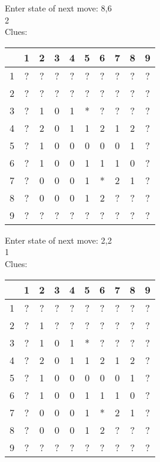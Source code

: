 Enter state of next move: 8,6\\
2\\
Clues:\\
\begin{tabular}{|c|c|c|c|c|c|c|c|c|c|}
\hline
  & 1 & 2 & 3 & 4 & 5 & 6 & 7 & 8 & 9\\
\hline
1 & ? & ? & ? & ? & ? & ? & ? & ? & ?\\
\hline
2 & ? & ? & ? & ? & ? & ? & ? & ? & ?\\
\hline
3 & ? & 1 & 0 & 1 & * & ? & ? & ? & ?\\
\hline
4 & ? & 2 & 0 & 1 & 1 & 2 & 1 & 2 & ?\\
\hline
5 & ? & 1 & 0 & 0 & 0 & 0 & 0 & 1 & ?\\
\hline
6 & ? & 1 & 0 & 0 & 1 & 1 & 1 & 0 & ?\\
\hline
7 & ? & 0 & 0 & 0 & 1 & * & 2 & 1 & ?\\
\hline
8 & ? & 0 & 0 & 0 & 1 & 2 & ? & ? & ?\\
\hline
9 & ? & ? & ? & ? & ? & ? & ? & ? & ?\\
\hline
\end{tabular}

Enter state of next move: 2,2\\
1\\
Clues:\\
\begin{tabular}{|c|c|c|c|c|c|c|c|c|c|}
\hline
  & 1 & 2 & 3 & 4 & 5 & 6 & 7 & 8 & 9\\
\hline
1 & ? & ? & ? & ? & ? & ? & ? & ? & ?\\
\hline
2 & ? & 1 & ? & ? & ? & ? & ? & ? & ?\\
\hline
3 & ? & 1 & 0 & 1 & * & ? & ? & ? & ?\\
\hline
4 & ? & 2 & 0 & 1 & 1 & 2 & 1 & 2 & ?\\
\hline
5 & ? & 1 & 0 & 0 & 0 & 0 & 0 & 1 & ?\\
\hline
6 & ? & 1 & 0 & 0 & 1 & 1 & 1 & 0 & ?\\
\hline
7 & ? & 0 & 0 & 0 & 1 & * & 2 & 1 & ?\\
\hline
8 & ? & 0 & 0 & 0 & 1 & 2 & ? & ? & ?\\
\hline
9 & ? & ? & ? & ? & ? & ? & ? & ? & ?\\
\hline
\end{tabular}


